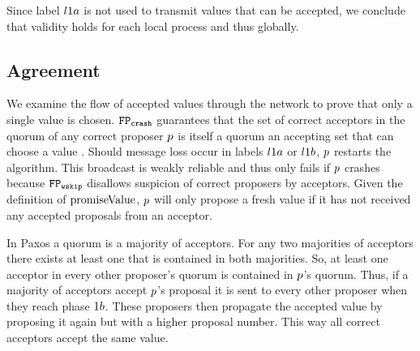 Since label $l1a$ is not used to transmit values that can be accepted, we conclude that validity holds for each local process and thus globally.

\subsection{Agreement}
We examine the flow of accepted values through the network to prove that only a single value is chosen.
$\mathtt{FP_{crash}}$ guarantees that the set of correct acceptors in the quorum of any correct proposer $p$ is itself a quorum \ie an accepting set that can choose a value \cite{Lamport06}.
Should message loss occur in labels $l1a$ or $l1b$, $p$ restarts the algorithm.
This broadcast is weakly reliable and thus only fails if $p$ crashes because $\mathtt{FP_{wskip}}$ disallows suspicion of correct proposers by acceptors.
Given the definition of $\operatorname{promiseValue}$, $p$ will only propose a fresh value if it has not received any accepted proposals from an acceptor.

In Paxos a quorum is a majority of acceptors.
For any two majorities of acceptors there exists at least one that is contained in both majorities.
So, at least one acceptor in every other proposer's quorum is contained in $p$'s quorum.
Thus, if a majority of acceptors accept $p$'s proposal it is sent to every other proposer when they reach phase $1b$.
These proposers then propagate the accepted value by proposing it again but with a higher proposal number.
This way all correct acceptors accept the same value.

